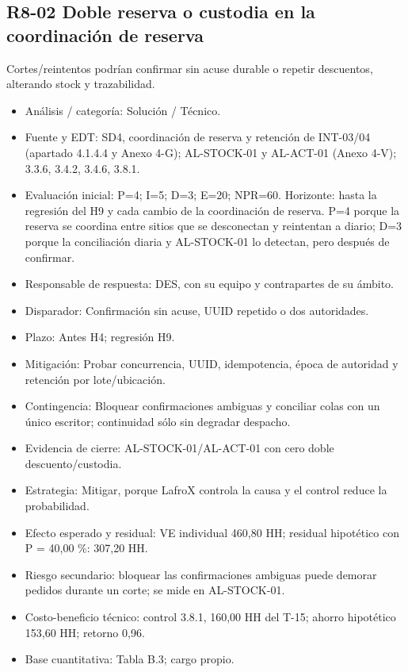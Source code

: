 \subsection*{R8-02 \textemdash{} Doble reserva o custodia en la coordinación de reserva}

Cortes/reintentos podrían confirmar sin acuse durable o repetir descuentos, alterando stock y trazabilidad.

\begin{itemize}[leftmargin=*,itemsep=3pt]
\item Análisis / categoría: Solución / Técnico.
\item Fuente y EDT: SD4, coordinación de reserva y retención de INT-03/04 (apartado 4.1.4.4 y Anexo 4-G); AL-STOCK-01 y AL-ACT-01 (Anexo 4-V); 3.3.6, 3.4.2, 3.4.6, 3.8.1.
\item Evaluación inicial: P=4; I=5; D=3; E=20; NPR=60. Horizonte: hasta la regresión del H9 y cada cambio de la coordinación de reserva. P=4 porque la reserva se coordina entre sitios que se desconectan y reintentan a diario; D=3 porque la conciliación diaria y AL-STOCK-01 lo detectan, pero después de confirmar.
\item Responsable de respuesta: DES, con su equipo y contrapartes de su ámbito.
\item Disparador: Confirmación sin acuse, UUID repetido o dos autoridades.
\item Plazo: Antes H4; regresión H9.
\item Mitigación: Probar concurrencia, UUID, idempotencia, época de autoridad y retención por lote/ubicación.
\item Contingencia: Bloquear confirmaciones ambiguas y conciliar colas con un único escritor; continuidad sólo sin degradar despacho.
\item Evidencia de cierre: AL-STOCK-01/AL-ACT-01 con cero doble descuento/custodia.
\item Estrategia: Mitigar, porque LafroX controla la causa y el control reduce la probabilidad.
\item Efecto esperado y residual: VE individual 460,80 HH; residual hipotético con P = 40,00 \%: 307,20 HH.
\item Riesgo secundario: bloquear las confirmaciones ambiguas puede demorar pedidos durante un corte; se mide en AL-STOCK-01.
\item Costo-beneficio técnico: control 3.8.1, 160,00 HH del T-15; ahorro hipotético 153,60 HH; retorno 0,96.
\item Base cuantitativa: Tabla B.3; cargo propio.
\end{itemize}

